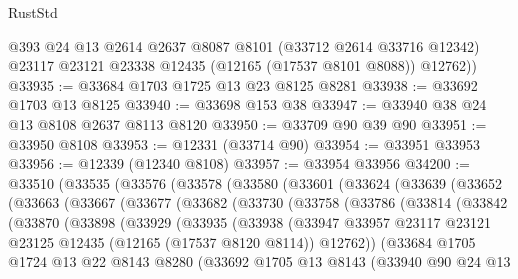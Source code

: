 \begin{lexlean}{RustStd}
\begin{coremodule}
        @393
        @24
        @13
        @2614
        @2637
        @8087
        @8101
        (@33712 @2614 @33716 @12342)
        @23117
        @23121
        @23338
        @12435
        (@12165 (@17537 @8101 @8088))
        @12762))
@33935 := @33684 @1703 @1725 @13 @23 @8125 @8281
@33938 := @33692 @1703 @13 @8125
@33940 := @33698 @153 @38
@33947 := @33940 @38 @24 @13 @8108 @2637 @8113 @8120
@33950 := @33709 @90 @39 @90
@33951 := @33950 @8108
@33953 := @12331 (@33714 @90)
@33954 := @33951 @33953
@33956 := @12339 (@12340 @8108)
@33957 := @33954 @33956
@34200 := @33510
    (@33535
      (@33576
        (@33578
          (@33580
            (@33601
              (@33624
                (@33639
                  (@33652
                    (@33663
                      (@33667
                        (@33677
                          (@33682
                            (@33730
                              (@33758
                                (@33786
                                  (@33814
                                    (@33842
                                      (@33870
                                        (@33898
                                          (@33929
                                            (@33935
                                              (@33938
                                                (@33947
                                                  @33957
                                                  @23117
                                                  @23121
                                                  @23125
                                                  @12435
                                                  (@12165 (@17537 @8120 @8114))
                                                  @12762))
                                              (@33684
                                                @1705
                                                @1724
                                                @13
                                                @22
                                                @8143
                                                @8280
                                                (@33692
                                                  @1705
                                                  @13
                                                  @8143
                                                  (@33940
                                                    @90
                                                    @24
                                                    @13

\end{coremodule}
\end{lexlean}
